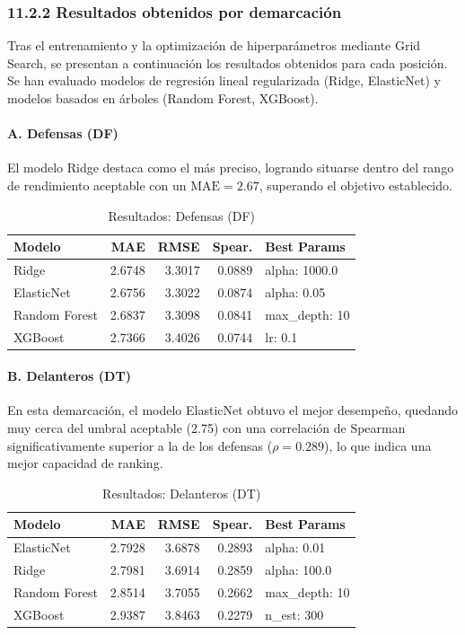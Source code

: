 \subsubsection{11.2.2 Resultados obtenidos por demarcación}

Tras el entrenamiento y la optimización de hiperparámetros mediante 
Grid Search, se presentan a continuación los resultados obtenidos 
para cada posición. Se han evaluado modelos de regresión lineal 
regularizada (Ridge, ElasticNet) y modelos basados en árboles 
(Random Forest, XGBoost).


\paragraph{A. Defensas (DF)}

El modelo Ridge destaca como el más preciso, logrando situarse 
dentro del rango de rendimiento aceptable con un 
$\mathrm{MAE} = 2.67$, superando el objetivo establecido.

\begin{table}[H]
\centering
\small
\begin{tabular}{|l|r|r|r|p{3cm}|}
\hline
\textbf{Modelo} & \textbf{MAE} & \textbf{RMSE} & \textbf{Spear.} & 
\textbf{Best Params} \\
\hline
Ridge & 2.6748 & 3.3017 & 0.0889 & alpha:
1000.0 \\
ElasticNet & 2.6756 & 3.3022 & 0.0874 & alpha: 0.05 \\
Random Forest & 2.6837 & 3.3098 & 0.0841 & max\_depth: 10 \\
XGBoost & 2.7366 & 3.4026 & 0.0744 & lr: 0.1 \\
\hline
\end{tabular}
\caption{Resultados: Defensas (DF)}
\end{table}


\paragraph{B. Delanteros (DT)}

En esta demarcación, el modelo ElasticNet obtuvo el mejor 
desempeño, quedando muy cerca del umbral aceptable (2.75) con una 
correlación de Spearman significativamente superior a la de los 
defensas ($\rho = 0.289$), lo que indica una mejor capacidad de 
ranking.

\begin{table}[H]
\centering
\small
\begin{tabular}{|l|r|r|r|p{3cm}|}
\hline
\textbf{Modelo} & \textbf{MAE} & \textbf{RMSE} & \textbf{Spear.} & 
\textbf{Best Params} \\
\hline
ElasticNet & 2.7928 & 3.6878 & 0.2893 & alpha: 0.01 \\
Ridge & 2.7981 & 3.6914 & 0.2859 & alpha: 100.0 \\
Random Forest & 2.8514 & 3.7055 & 0.2662 & max\_depth: 10 \\
XGBoost & 2.9387 & 3.8463 & 0.2279 & n\_est: 300 \\
\hline
\end{tabular}
\caption{Resultados: Delanteros (DT)}
\end{table}


